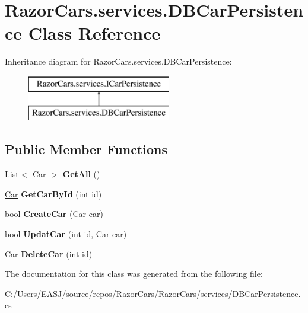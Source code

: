 \hypertarget{class_razor_cars_1_1services_1_1_d_b_car_persistence}{}\section{Razor\+Cars.\+services.\+D\+B\+Car\+Persistence Class Reference}
\label{class_razor_cars_1_1services_1_1_d_b_car_persistence}
Inheritance diagram for Razor\+Cars.\+services.\+D\+B\+Car\+Persistence\+:\begin{figure}[H]
\begin{center}
\leavevmode
\includegraphics[height=2.000000cm]{class_razor_cars_1_1services_1_1_d_b_car_persistence}
\end{center}
\end{figure}
\subsection*{Public Member Functions}
\begin{DoxyCompactItemize}
\item 
\mbox{\label{class_razor_cars_1_1services_1_1_d_b_car_persistence_a1146c2ead849387f878225af420d4a47}} 
List$<$ \mbox{\hyperlink{class_razor_cars_1_1model_1_1_car}{Car}} $>$ {\bfseries Get\+All} ()
\item 
\mbox{\label{class_razor_cars_1_1services_1_1_d_b_car_persistence_a73ce05fff5d754cf9e0090145dc66a31}} 
\mbox{\hyperlink{class_razor_cars_1_1model_1_1_car}{Car}} {\bfseries Get\+Car\+By\+Id} (int id)
\item 
\mbox{\label{class_razor_cars_1_1services_1_1_d_b_car_persistence_a87fda36cc03cc1e54c4be084b4037c5c}} 
bool {\bfseries Create\+Car} (\mbox{\hyperlink{class_razor_cars_1_1model_1_1_car}{Car}} car)
\item 
\mbox{\label{class_razor_cars_1_1services_1_1_d_b_car_persistence_abe25b04b86ee6c2d7835b59b7f169517}} 
bool {\bfseries Updat\+Car} (int id, \mbox{\hyperlink{class_razor_cars_1_1model_1_1_car}{Car}} car)
\item 
\mbox{\label{class_razor_cars_1_1services_1_1_d_b_car_persistence_af2f7b64063b5457742aa804f0088ed51}} 
\mbox{\hyperlink{class_razor_cars_1_1model_1_1_car}{Car}} {\bfseries Delete\+Car} (int id)
\end{DoxyCompactItemize}


The documentation for this class was generated from the following file\+:\begin{DoxyCompactItemize}
\item 
C\+:/\+Users/\+E\+A\+S\+J/source/repos/\+Razor\+Cars/\+Razor\+Cars/services/D\+B\+Car\+Persistence.\+cs\end{DoxyCompactItemize}
